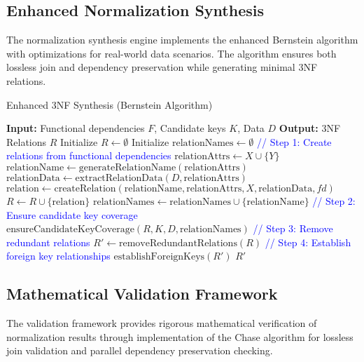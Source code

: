 \documentclass[acmsmall]{acmart}
\begin{document}
\subsection{Enhanced Normalization Synthesis}

The normalization synthesis engine implements the enhanced Bernstein algorithm with optimizations for real-world data scenarios. The algorithm ensures both lossless join and dependency preservation while generating minimal 3NF relations.

\begin{algorithm}[h]
\caption{Enhanced 3NF Synthesis (Bernstein Algorithm)}
\label{alg:3nf_synthesis}
\begin{algorithmic}[1]
\STATE \textbf{Input:} Functional dependencies $F$, Candidate keys $K$, Data $D$
\STATE \textbf{Output:} 3NF Relations $R$
\STATE Initialize $R \leftarrow \emptyset$
\STATE Initialize $\text{relationNames} \leftarrow \emptyset$
\STATE \textcolor{blue}{// Step 1: Create relations from functional dependencies}
    \STATE $\text{relationAttrs} \leftarrow X \cup \{Y\}$
    \STATE $\text{relationName} \leftarrow \text{generateRelationName}(\text{relationAttrs})$
        \STATE $\text{relationData} \leftarrow \text{extractRelationData}(D, \text{relationAttrs})$
        \STATE $\text{relation} \leftarrow \text{createRelation}(\text{relationName}, \text{relationAttrs}, X, \text{relationData}, fd)$
        \STATE $R \leftarrow R \cup \{\text{relation}\}$
        \STATE $\text{relationNames} \leftarrow \text{relationNames} \cup \{\text{relationName}\}$
    \ENDIF
\ENDFOR
\STATE \textcolor{blue}{// Step 2: Ensure candidate key coverage}
\STATE $\text{ensureCandidateKeyCoverage}(R, K, D, \text{relationNames})$
\STATE \textcolor{blue}{// Step 3: Remove redundant relations}
\STATE $R' \leftarrow \text{removeRedundantRelations}(R)$
\STATE \textcolor{blue}{// Step 4: Establish foreign key relationships}
\STATE $\text{establishForeignKeys}(R')$
\RETURN $R'$
\end{algorithmic}
\end{algorithm}

\subsection{Mathematical Validation Framework}

The validation framework provides rigorous mathematical verification of normalization results through implementation of the Chase algorithm for lossless join validation and parallel dependency preservation checking.
\end{document}
